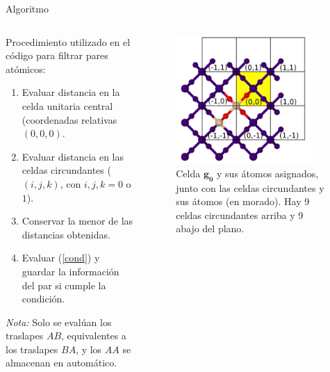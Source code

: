 \documentclass[dvisvgm,11pt,aspectratio=169]{beamer}
\begin{document}
\begin{frame}{Algoritmo}
\begin{columns}
\begin{column}{0.6\textwidth}
	Procedimiento utilizado en el código para filtrar pares atómicos:
	\begin{enumerate}
		\item Evaluar distancia en la celda unitaria central (coordenadas relativas $(0,0,0)$.
		\item Evaluar distancia en las celdas circundantes ($(i,j,k)$, con $i,j,k = 0$ o $1$).
		\item Conservar la menor de las distancias obtenidas.
		\item Evaluar (\ref{cond}) y guardar la información del par si cumple la condición.
	\end{enumerate}
	\textit{Nota:} Solo se evalúan los traslapes $AB$, equivalentes a los traslapes $BA$, y los $AA$ se almacenan en automático.
\end{column}
\begin{column}{0.4\textwidth}
\begin{figure}
\includegraphics[width=0.9\textwidth]{img/surrCellSio2_4}
\caption{Celda $\mathbf{g_0}$ y sus átomos asignados, junto con las celdas circundantes y sus átomos (en morado). Hay 9 celdas circundantes arriba y 9 abajo del plano.}
\end{figure}
\end{column}
\end{columns}
\end{frame}
\end{document}
